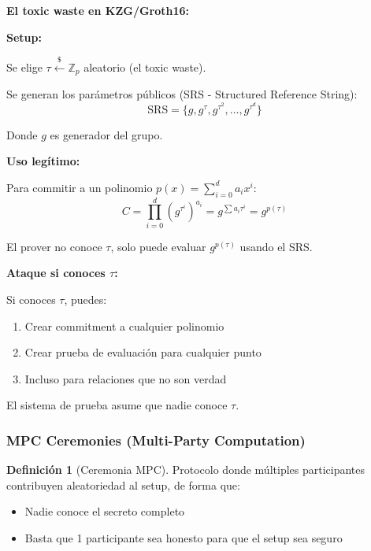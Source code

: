 \documentclass[11pt,a4paper,twoside,openright]{book}
\theoremstyle{definition}
\newtheorem{definition}{Definición}[chapter]
\theoremstyle{plain}
\theoremstyle{remark}
\begin{document}
\begin{mathnote}
\textbf{El toxic waste en KZG/Groth16:}

\textbf{Setup:}

Se elige $\tau \xleftarrow{\$} \mathbb{Z}_p$ aleatorio (el toxic waste).

Se generan los parámetros públicos (SRS - Structured Reference String):
\[ \text{SRS} = \{g, g^\tau, g^{\tau^2}, \ldots, g^{\tau^d}\} \]

Donde $g$ es generador del grupo.

\textbf{Uso legítimo:}

Para commitir a un polinomio $p(x) = \sum_{i=0}^{d} a_i x^i$:
\[ C = \prod_{i=0}^{d} (g^{\tau^i})^{a_i} = g^{\sum a_i \tau^i} = g^{p(\tau)} \]

El prover no conoce $\tau$, solo puede evaluar $g^{p(\tau)}$ usando el SRS.

\textbf{Ataque si conoces $\tau$:}

Si conoces $\tau$, puedes:
\begin{enumerate}
    \item Crear commitment a cualquier polinomio
    \item Crear prueba de evaluación para cualquier punto
    \item Incluso para relaciones que no son verdad
\end{enumerate}

El sistema de prueba asume que nadie conoce $\tau$.
\end{mathnote}

\subsubsection{MPC Ceremonies (Multi-Party Computation)}

\begin{definition}[Ceremonia MPC]
Protocolo donde múltiples participantes contribuyen aleatoriedad al setup, de forma que:
\begin{itemize}
    \item Nadie conoce el secreto completo
    \item Basta que 1 participante sea honesto para que el setup sea seguro
\end{itemize}
\end{definition}
\end{document}
